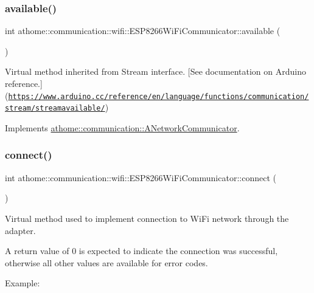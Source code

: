 \subsubsection{\texorpdfstring{available()}{available()}}
{\footnotesize\ttfamily int athome\+::communication\+::wifi\+::\+E\+S\+P8266\+Wi\+Fi\+Communicator\+::available (\begin{DoxyParamCaption}{ }\end{DoxyParamCaption})\hspace{0.3cm}{\ttfamily [virtual]}}

Virtual method inherited from Stream interface. \mbox{[}See documentation on Arduino reference.\mbox{]}(\href{https://www.arduino.cc/reference/en/language/functions/communication/stream/streamavailable/}{\tt https\+://www.\+arduino.\+cc/reference/en/language/functions/communication/stream/streamavailable/}) 

Implements \mbox{\hyperlink{classathome_1_1communication_1_1_a_network_communicator_a2bf367d03c98e8523fda71dd43ffa2fb}{athome\+::communication\+::\+A\+Network\+Communicator}}.

\mbox{\label{classathome_1_1communication_1_1wifi_1_1_e_s_p8266_wi_fi_communicator_a58cc439be2f368b346bbbe1601a9b675}} 
\subsubsection{\texorpdfstring{connect()}{connect()}}
{\footnotesize\ttfamily int athome\+::communication\+::wifi\+::\+E\+S\+P8266\+Wi\+Fi\+Communicator\+::connect (\begin{DoxyParamCaption}{ }\end{DoxyParamCaption})\hspace{0.3cm}{\ttfamily [virtual]}}

Virtual method used to implement connection to Wi\+Fi network through the adapter.

A return value of 0 is expected to indicate the connection was successful, otherwise all other values are available for error codes.

Example\+:


